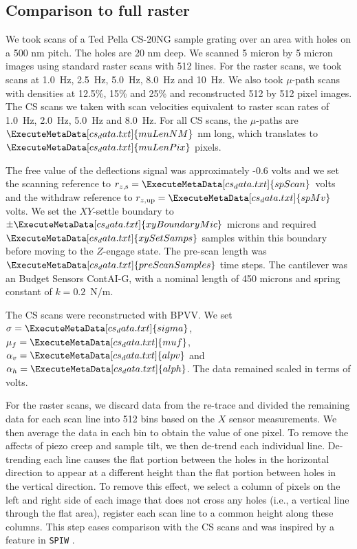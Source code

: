 \documentclass[twocolumn,oneside]{IEEEtran/IEEEtran}
\newcommand{\xc}{\ensuremath{X}\xspace}
\newcommand{\rzup}{\ensuremath{r_{z,\textrm{up}}}\xspace}
\newcommand{\rzs}{\ensuremath{r_{z,\textrm{s}}}\xspace}
\newcommand{\scanD}[1]{\ExecuteMetaData[cs_data.txt]{#1}}
\begin{document}
\subsection{Comparison to full raster}
We took scans of a Ted Pella CS-20NG sample grating over an area with
holes on a 500 nm pitch. The holes are 20 nm deep. We scanned 5 micron
by 5 micron images using standard raster scans with 512 lines. For the
raster scans, we took scans at 1.0~Hz, 2.5~Hz, 5.0~Hz, 8.0~Hz and
10~Hz. We also took $\mu$-path scans with densities at 12.5\%, 15\%
and 25\% and reconstructed 512 by 512 pixel images. The CS scans we
taken with scan velocities equivalent to raster scan rates of 1.0~Hz,
2.0~Hz, 5.0~Hz and 8.0~Hz. For all CS scans, the $\mu$-paths are
$\scanD{muLenNM}$ nm long, which translates to $\scanD{muLenPix}$
pixels.

The free value of the deflections signal was approximately -0.6 volts
and we set the scanning reference to ${\rzs=\scanD{spScan}}$~volts and
the withdraw reference to ${\rzup=\scanD{spMv}}$ volts. We set the
$XY$-settle boundary to $\pm \scanD{xyBoundaryMic}$ microns and
required $\scanD{xySetSamps}$ samples within this boundary before
moving to the $Z$-engage state. The pre-scan length was
$\scanD{preScanSamples}$ time steps. The cantilever was an Budget
Sensors ContAI-G, with a nominal length of 450 microns and spring
constant of $k=0.2$~N/m.

The CS scans were reconstructed with BPVV. We set
${\sigma = \scanD{sigma}}$, ${\mu_f=\scanD{muf}}$,
${\alpha_v=\scanD{alpv}}$ and ${\alpha_h=\scanD{alph}}$. The data
remained scaled in terms of volts.

For the raster scans, we discard data from the re-trace and divided
the remaining data for each scan line into 512 bins based on the \xc
sensor measurements. We then average the data in each bin to obtain
the value of one pixel. To remove the affects of piezo creep and
sample tilt, we then de-trend each individual line. De-trending each
line causes the flat portion between the holes in the horizontal
direction to appear at a different height than the flat portion
between holes in the vertical direction. To remove this effect, we
select a column of pixels on the left and right side of each image
that does not cross any holes (i.e., a vertical line through the flat
area), register each scan line to a common height along these columns.
This step eases comparison with the CS scans and was inspired by a
feature in \texttt{SPIW} \cite{spiw}.
\end{document}
